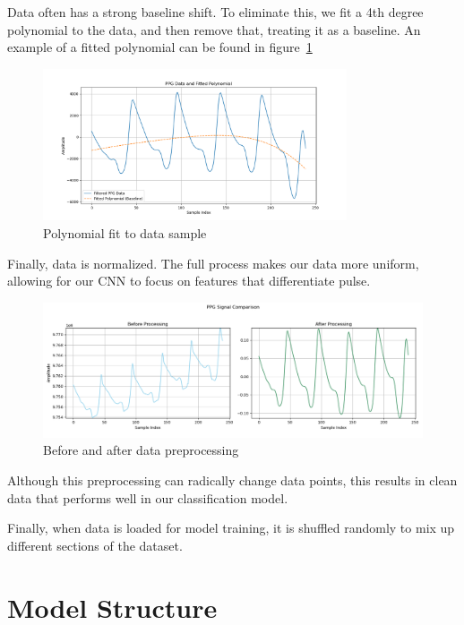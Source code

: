 \documentclass{article}
\begin{document}
Data often has a strong baseline shift. To eliminate this, we fit a 4th degree polynomial to the data, and then remove that, treating it as a baseline. An example of a fitted polynomial can be found in figure~\ref{fig:poly}

\begin{figure}[H]
    \centering
    \includegraphics[width=0.8\textwidth]{../media/poly.png}
    \caption{Polynomial fit to data sample}
    \label{fig:poly}
\end{figure}

Finally, data is normalized. The full process makes our data more uniform, allowing for our CNN to focus on features that differentiate pulse.

\begin{figure}[H]
    \centering
    \includegraphics[width=1.0\textwidth]{../media/bef_n_aft.png}
    \caption{Before and after data preprocessing}
    \label{fig:bef_n_aft}
\end{figure}

Although this preprocessing can radically change data points, this results in clean data that performs well in our classification model.

Finally, when data is loaded for model training, it is shuffled randomly to mix up different sections of the dataset.


\section{Model Structure}
\end{document}
